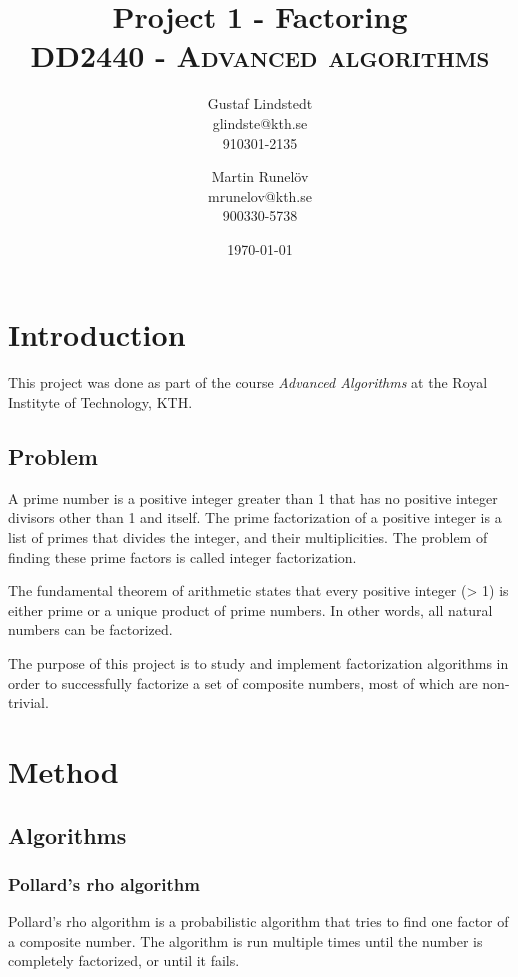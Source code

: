 \documentclass[paper=a4, fontsize=11pt,numbers=endperiod]{scrartcl} %
\title{ 
\huge Project 1 - Factoring \\ %
\vspace{10pt}
\normalfont \normalsize 
\textsc{DD2440 - Advanced algorithms } \\ [25pt] %
}
\author{Gustaf Lindstedt \\ glindste@kth.se \\ 910301-2135 \and Martin Runelöv \\ mrunelov@kth.se \\ 900330-5738}
\date{\vspace{8pt}\normalsize\today} %
\numberwithin{equation}{section} %
\numberwithin{figure}{section} %
\numberwithin{table}{section} %
\begin{document}
\maketitle %




\section{Introduction}

This project was done as part of the course \emph{Advanced Algorithms} at the Royal Instityte of Technology, KTH.

\subsection{Problem}
A prime number is a positive integer greater than 1 that has no positive integer divisors other than 1 and itself.
The prime factorization of a positive integer is a list of primes that divides the integer, and their multiplicities.
The problem of finding these prime factors is called integer factorization.

The fundamental theorem of arithmetic states that every positive integer (> 1) is either prime or a unique product of prime numbers.
In other words, all natural numbers can be factorized.

The purpose of this project is to study and implement factorization algorithms in order to successfully factorize a set of composite numbers, most of which are non-trivial.



\section{Method}
\subsection{Algorithms}
\subsubsection{Pollard's rho algorithm}
Pollard's rho algorithm \cite{pollard}\cite{algnotes} is a probabilistic algorithm that tries to find one factor of a composite number.
The algorithm is run multiple times until the number is completely factorized, or until it fails.
\end{document}
